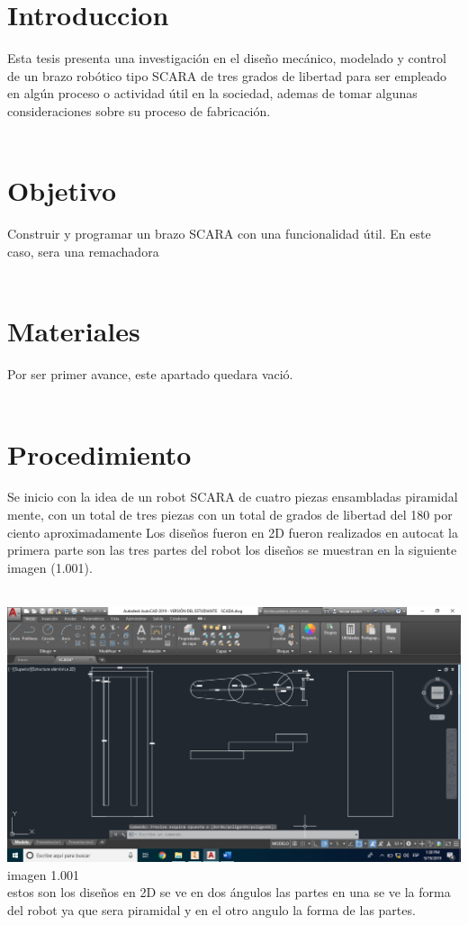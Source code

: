 \documentclass[10pt,a4paper]{article}
\begin{document}
\section{Introduccion}
{\Large Esta tesis presenta una investigación en el 			diseño mecánico, modelado y control de un 				brazo robótico tipo SCARA de tres grados de 			libertad para ser empleado en algún proceso o 			actividad útil en la sociedad, ademas de tomar 			algunas consideraciones sobre su proceso de 			fabricación.} \\ \\

\section{{\Huge Objetivo}}
{\Large Construir y programar un brazo SCARA con una funcionalidad útil. En este caso, sera una remachadora}\\ \\

\section{{\Huge Materiales}}
{\Large Por ser primer avance, este apartado quedara vació.}\\ \\	

\section{{\Huge Procedimiento}}
{\Large Se inicio con la idea de un robot SCARA de cuatro piezas ensambladas piramidal mente, con un total de tres piezas con un total de grados de libertad del 180 por ciento aproximadamente Los diseños fueron en 2D fueron realizados en autocat la primera parte son las tres partes del robot los diseños se muestran en la siguiente imagen (1.001).}\\ \\
\begin{center}
\includegraphics[scale=0.25]{Imagenes/2D.png} imagen 1.001  
\\{estos son los diseños en 2D se ve en dos ángulos las partes en una se ve la forma del robot ya que sera piramidal y en el otro angulo la forma de las partes.} \\ 
\end{center}
\end{document}
